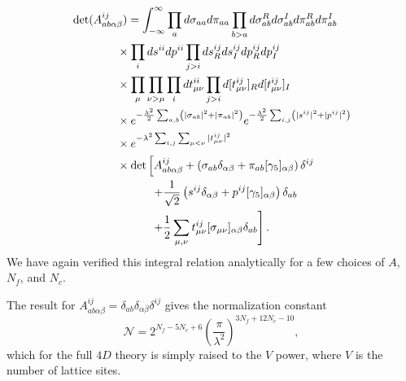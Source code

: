 \documentclass[%
    twocolumn,
superscriptaddress,
preprintnumbers,
nofootinbib,
 amsmath,amssymb,
 aps,
 prd,
 floatfix,
]{revtex4-2}
\begin{document}
\begin{equation}
  \begin{split}
    &\det(A_{ab\alpha\beta}^{ij}) = \int_{-\infty}^{\infty} \prod_a d\sigma_{aa}d\pi_{aa} \prod_{b>a} d\sigma_{ab}^R d\sigma_{ab}^I d\pi_{ab}^R d\pi_{ab}^I \\ 
    &\hspace{40pt}\times \prod_i ds^{ii}dp^{ii} \prod_{j>i} ds^{ij}_R ds^{ij}_I dp^{ij}_R dp^{ij}_I \\
     &\hspace{40pt}\times \prod_{\mu} \prod_{\nu > \mu} \prod_i dt_{\mu\nu}^{ii} \prod_{j>i} d[t_{\mu\nu}^{ij}]_R d[t_{\mu\nu}^{ij}]_I  \\
    &\hspace{40pt} \times  e^{-\frac{\lambda^2}{2} \sum_{a,b} \left( |\sigma_{ab}|^2 + |\pi_{ab}|^2 \right)} e^{-\frac{\lambda^2}{2} \sum_{i,j} \left( |s^{ij}|^2 + |p^{ij}|^2 \right) } \\
    &\hspace{40pt} \times e^{-\lambda^2 \sum_{i,j} \sum_{\mu < \nu} |t_{\mu\nu}^{ij}|^2  } \\
    &\hspace{40pt} \times \det\left[A_{ab\alpha\beta}^{ij}  + \left(\sigma_{ab}\delta_{\alpha\beta} + \pi_{ab} [\gamma_5]_{\alpha\beta}\right)\delta^{ij} \right. \\
    &\hspace{70pt} \left. + \frac{1}{\sqrt{2}} \left(s^{ij}\delta_{\alpha\beta} + p^{ij} [\gamma_5]_{\alpha\beta} \right)\delta_{ab} \right. \\
    &\hspace{70pt} \left. + \frac{1}{2} \sum_{\mu,\nu} t^{ij}_{\mu\nu}[\sigma_{\mu\nu}]_{\alpha\beta} \delta_{ab}  \vphantom{A_{ab\alpha\beta}^{ij}}\right].
  \end{split}
\end{equation}
We have again verified this integral relation analytically for a few choices of $A$, $N_f$, and $N_c$.

The result for $A_{ab\alpha\beta}^{ij} = \delta_{ab}\delta_{\alpha\beta}\delta^{ij}$ gives the normalization constant
\begin{equation}
    \mathcal{N} = 2^{N_f - 5N_c + 6} \left( \frac{\pi}{\lambda^2} \right)^{3N_f + 12N_c - 10 },
\end{equation}
which for the full $4D$ theory is simply raised to the $V$ power, where $V$ is the number of lattice sites.
\end{document}
